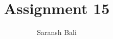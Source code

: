 \documentclass[journal,12pt,twocolumn]{IEEEtran}
\begin{document}
	\makeatletter
	\makeatother
	\let\StandardTheFigure\thefigure
	\let\vec\mathbf
	\renewcommand{\thefigure}{\theproblem}
	\def\putbox#1#2#3{\makebox[0in][l]{\makebox[#1][l]{}\raisebox{\baselineskip}[0in][0in]{\raisebox{#2}[0in][0in]{#3}}}}
	\def\rightbox#1{\makebox[0in][r]{#1}}
	\def\centbox#1{\makebox[0in]{#1}}
	\def\topbox#1{\raisebox{-\baselineskip}[0in][0in]{#1}}
	\def\midbox#1{\raisebox{-0.5\baselineskip}[0in][0in]{#1}}
	\vspace{3cm}
	\title{Assignment 15}
	\author{Saransh Bali}
\end{document}
